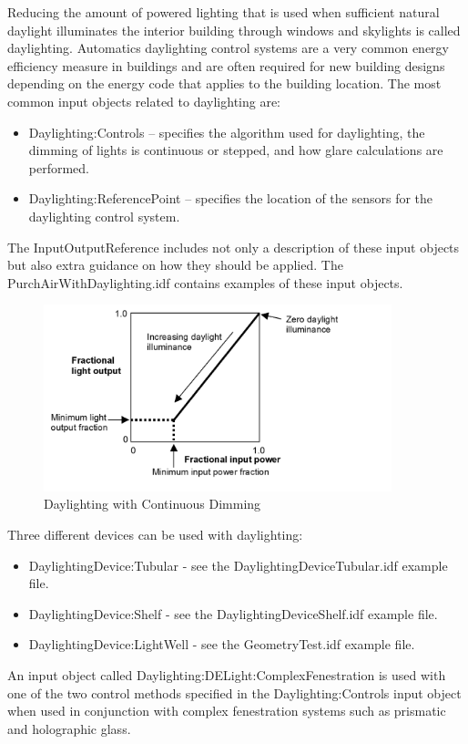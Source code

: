 Reducing the amount of powered lighting that is used when sufficient
natural daylight illuminates the interior building through windows
and skylights is called daylighting. Automatics daylighting control
systems are a very common energy efficiency measure in buildings and
are often required for new building designs depending on the energy
code that applies to the building location. The most common input
objects related to daylighting are: 
\begin{itemize}
\item Daylighting:Controls -- specifies the algorithm used for daylighting,
the dimming of lights is continuous or stepped, and how glare calculations
are performed. 
\item Daylighting:ReferencePoint -- specifies the location of the sensors
for the daylighting control system.
\end{itemize}
The InputOutputReference includes not only a description of these
input objects but also extra guidance on how they should be applied.
The PurchAirWithDaylighting.idf contains examples of these input objects.

\begin{figure}[hbtp] 
\centering
\includegraphics[width=0.9\textwidth, height=0.9\textheight, keepaspectratio=true]{media/DaylightingContinuous.png}
\caption{Daylighting with Continuous Dimming}
\end{figure}


Three different devices can be used with daylighting: 
\begin{itemize}
\item DaylightingDevice:Tubular - see the DaylightingDeviceTubular.idf example
file.
\item DaylightingDevice:Shelf - see the DaylightingDeviceShelf.idf example
file.
\item DaylightingDevice:LightWell - see the GeometryTest.idf example file.
\end{itemize}
An input object called Daylighting:DELight:ComplexFenestration is
used with one of the two control methods specified in the Daylighting:Controls
input object when used in conjunction with complex fenestration systems
such as prismatic and holographic glass. 

